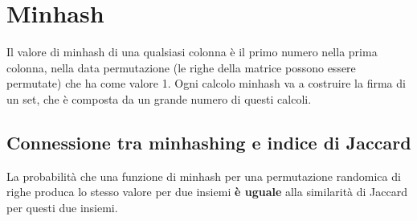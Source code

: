 \documentclass[\main/main.tex]{subfiles}
\begin{document}
\section{Minhash}

\begin{definition}[Minhash]
  Il valore di minhash di una qualsiasi colonna è il primo numero nella prima colonna, nella data permutazione (le righe della matrice possono essere permutate) che ha come valore 1.
  Ogni calcolo minhash va a costruire la firma di un set, che è composta da un grande numero di questi calcoli.
\end{definition}

\subsection{Connessione tra minhashing e indice di Jaccard}
La probabilità che una funzione di minhash per una permutazione randomica di righe produca lo stesso valore per due insiemi \textbf{è uguale} alla similarità di Jaccard per questi due insiemi.
\end{document}
